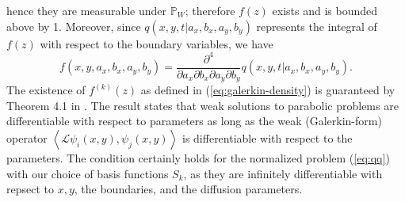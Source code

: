 hence they are measurable under $\mathbb{P}_{W}$; therefore $f(z)$ exists and
is bounded above by 1. Moreover, since $q(x,y,t|a_x,b_x,a_y,b_y)$ represents the
integral of $f(z)$ with respect to the boundary variables, we have
\[
  f(x,y,a_x,b_x,a_y,b_y) = \frac{\partial^4}{\partial a_x \partial b_x \partial a_y \partial
         b_y} q(x,y,t | a_x, b_x, a_y, b_y).
\]
The existence of $f^{(k)}(z)$ as defined in
(\ref{eq:galerkin-density}) is guaranteed by Theorem 4.1 in
\cite{singler2008differentiability}. The result states that weak
solutions to parabolic problems are differentiable with respect to
parameters as long as the weak (Galerkin-form) operator
$\left< \mathcal{L} \psi_i(x,y), \psi_j(x,y) \right>$ is
differentiable with respect to the parameters. The condition certainly
holds for the normalized problem (\ref{eq:qq}) with our choice of
basis functions $S_k$, as they are infinitely differentiable with
repsect to $x,y$, the boundaries, and the diffusion parameters. 

